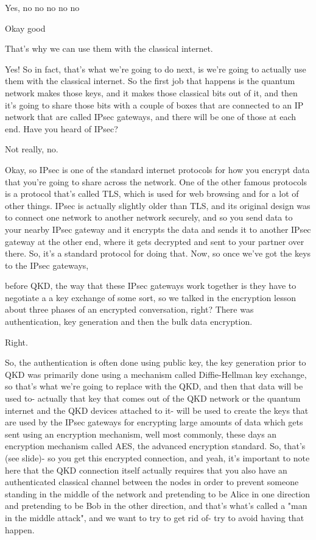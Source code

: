 Yes, no no no no no

Okay good

That's why we can use them with the classical internet.

Yes! So in fact, that's what we're going to do next, is we're going to actually use them with the classical internet. So the first job that happens is the quantum network makes those keys, and it makes those classical bits out of it, and then it's going to share those bits with a couple of boxes that are connected to an IP network that are called IPsec gateways, and there will be one of those at each end. Have you heard of IPsec?

Not really, no.

Okay, so IPsec is one of the standard internet protocols for how you encrypt data that you're going to share across the network. One of the other famous protocols is a protocol that's called TLS, which is used for web browsing and for a lot of other things. IPsec is actually slightly older than TLS, and its original design was to connect one network to another network securely, and so you send data to your nearby IPsec gateway and it encrypts the data and sends it to another IPsec gateway at the other end, where it gets decrypted and sent to your partner over there. So, it's a standard protocol for doing that. Now, so once we've got the keys to the IPsec gateways,

before QKD, the way that these IPsec gateways work together is they have to negotiate a a key exchange of some sort, so we talked in the encryption lesson about three phases of an encrypted conversation, right? There was authentication, key generation and then the bulk data encryption.

Right.

So, the authentication is often done using public key, the key generation prior to QKD was primarily done using a mechanism called Diffie-Hellman key exchange, so that's what we're going to replace with the QKD, and then that data will be used to- actually that key that comes out of the QKD network or the quantum internet and the QKD devices attached to it- will be used to create the keys that are used by the IPsec gateways for encrypting large amounts of data which gets sent using an encryption mechanism, well most commonly, these days an encryption mechanism called AES, the advanced encryption standard. So, that's (see slide)- so you get this encrypted connection, and yeah, it's important to note here that the QKD connection itself actually requires that you also have an authenticated classical channel between the nodes in order to prevent someone standing in the middle of the network and pretending to be Alice in one direction and pretending to be Bob in the other direction, and that's what's called a "man in the middle attack", and we want to try to get rid of- try to avoid having that happen.

